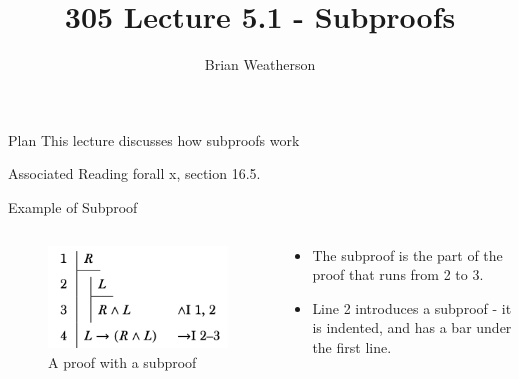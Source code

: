 \documentclass[
  ignorenonframetext,
]{beamer}
\title{305 Lecture 5.1 - Subproofs}
\author{Brian Weatherson}
\date{}
\providecommand{\tightlist}{%
  \setlength{\itemsep}{0pt}\setlength{\parskip}{0pt}}
\renewcommand{\,}{\text{, }}
\begin{document}
\frame{\titlepage}

\begin{frame}{Plan}
\protect\hypertarget{plan}{}
This lecture discusses how subproofs work
\end{frame}

\begin{frame}{Associated Reading}
\protect\hypertarget{associated-reading}{}
forall x, section 16.5.
\end{frame}

\begin{frame}{Example of Subproof}
\protect\hypertarget{example-of-subproof}{}
\begin{columns}[c]
\begin{column}{0.48\textwidth}
\begin{figure}
\centering
\includegraphics{4_7c.png}
\caption{A proof with a subproof}
\end{figure}
\end{column}

\begin{column}{0.48\textwidth}
\begin{itemize}
\tightlist
\item
  The subproof is the part of the proof that runs from 2 to 3.
\item
  Line 2 introduces a subproof - it is indented, and has a bar under the
  first line.
\end{itemize}
\end{column}
\end{columns}
\end{frame}
\end{document}
